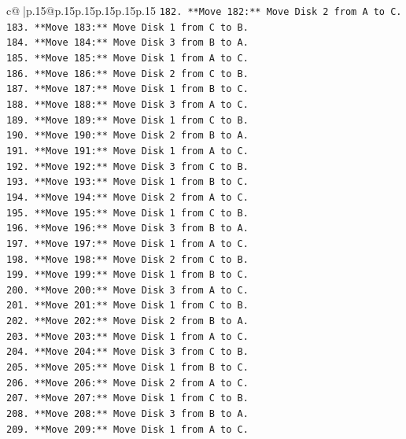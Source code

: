 \documentclass{article}
\begin{document}
{\begin{supertabular}{c@{$\;$}|p{.15\linewidth}@{}p{.15\linewidth}p{.15\linewidth}p{.15\linewidth}p{.15\linewidth}p{.15\linewidth}}
{{{\texttt{182. **Move 182:** Move Disk 2 from A to C.} \\
\texttt{183. **Move 183:** Move Disk 1 from C to B.} \\
\texttt{184. **Move 184:** Move Disk 3 from B to A.} \\
\texttt{185. **Move 185:** Move Disk 1 from A to C.} \\
\texttt{186. **Move 186:** Move Disk 2 from C to B.} \\
\texttt{187. **Move 187:** Move Disk 1 from B to C.} \\
\texttt{188. **Move 188:** Move Disk 3 from A to C.} \\
\texttt{189. **Move 189:** Move Disk 1 from C to B.} \\
\texttt{190. **Move 190:** Move Disk 2 from B to A.} \\
\texttt{191. **Move 191:** Move Disk 1 from A to C.} \\
\texttt{192. **Move 192:** Move Disk 3 from C to B.} \\
\texttt{193. **Move 193:** Move Disk 1 from B to C.} \\
\texttt{194. **Move 194:** Move Disk 2 from A to C.} \\
\texttt{195. **Move 195:** Move Disk 1 from C to B.} \\
\texttt{196. **Move 196:** Move Disk 3 from B to A.} \\
\texttt{197. **Move 197:** Move Disk 1 from A to C.} \\
\texttt{198. **Move 198:** Move Disk 2 from C to B.} \\
\texttt{199. **Move 199:** Move Disk 1 from B to C.} \\
\texttt{200. **Move 200:** Move Disk 3 from A to C.} \\
\texttt{201. **Move 201:** Move Disk 1 from C to B.} \\
\texttt{202. **Move 202:** Move Disk 2 from B to A.} \\
\texttt{203. **Move 203:** Move Disk 1 from A to C.} \\
\texttt{204. **Move 204:** Move Disk 3 from C to B.} \\
\texttt{205. **Move 205:** Move Disk 1 from B to C.} \\
\texttt{206. **Move 206:** Move Disk 2 from A to C.} \\
\texttt{207. **Move 207:** Move Disk 1 from C to B.} \\
\texttt{208. **Move 208:** Move Disk 3 from B to A.} \\
\texttt{209. **Move 209:** Move Disk 1 from A to C.} \\
}}}
\end{supertabular}}
\end{document}
